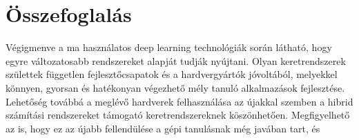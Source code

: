 \chapter*{Összefoglalás}
Végigmenve a ma használatos deep learning technológiák során látható, hogy egyre változatosabb rendszereket alapját tudják nyújtani. Olyan keretrendszerek születtek független fejlesztőcsapatok és a hardvergyártók jóvoltából, melyekkel könnyen, gyorsan és hatékonyan végezhető mély tanuló alkalmazások fejlesztése. Lehetőség továbbá a meglévő hardverek felhasználása az újakkal szemben a hibrid számítási rendszereket támogató keretrendszereknek köszönhetően. Megfigyelhető az is, hogy ez az újabb fellendülése a gépi tanulásnak még javában tart, és 